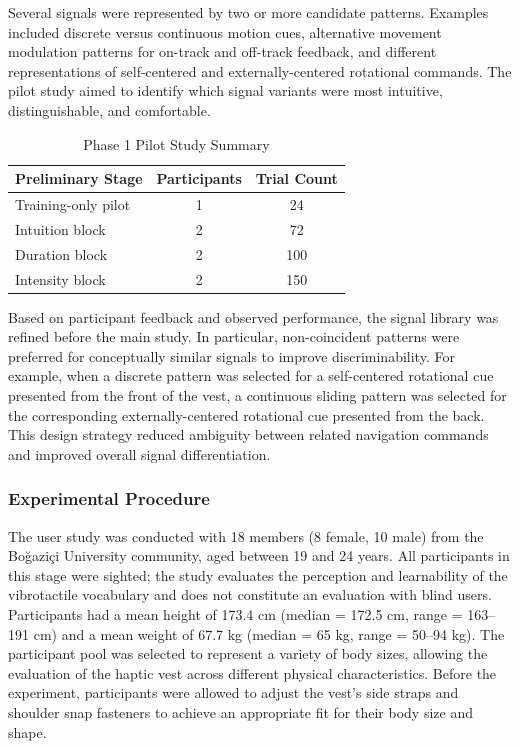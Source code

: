 \documentclass[12pt]{report}
\begin{document}
Several signals were represented by two or more candidate patterns. Examples included discrete versus continuous motion cues, alternative movement modulation patterns for on-track and off-track feedback, and different representations of self-centered and externally-centered rotational commands. The pilot study aimed to identify which signal variants were most intuitive, distinguishable, and comfortable.

\begin{table}[H]
\centering
\caption{Phase 1 Pilot Study Summary}
\label{tab:pilot_study}
\begin{tabular}{lcc}
\hline
\textbf{Preliminary Stage} & \textbf{Participants} & \textbf{Trial Count} \\
\hline
Training-only pilot & 1 & 24 \\
Intuition block & 2 & 72 \\
Duration block & 2 & 100 \\
Intensity block & 2 & 150 \\
\hline
\end{tabular}
\end{table}

Based on participant feedback and observed performance, the signal library was refined before the main study. In particular, non-coincident patterns were preferred for conceptually similar signals to improve discriminability. For example, when a discrete pattern was selected for a self-centered rotational cue presented from the front of the vest, a continuous sliding pattern was selected for the corresponding externally-centered rotational cue presented from the back. This design strategy reduced ambiguity between related navigation commands and improved overall signal differentiation.

\subsubsection*{Experimental Procedure}

The user study was conducted with 18 members (8 female, 10 male) from the Bo\u{g}azi\c{c}i University community, aged between 19 and 24 years. All participants in this stage were sighted; the study evaluates the perception and learnability of the vibrotactile vocabulary and does not constitute an evaluation with blind users. Participants had a mean height of 173.4 cm (median = 172.5 cm, range = 163--191 cm) and a mean weight of 67.7 kg (median = 65 kg, range = 50--94 kg). The participant pool was selected to represent a variety of body sizes, allowing the evaluation of the haptic vest across different physical characteristics. Before the experiment, participants were allowed to adjust the vest's side straps and shoulder snap fasteners to achieve an appropriate fit for their body size and shape.
\end{document}
